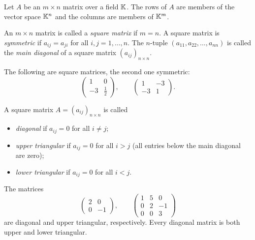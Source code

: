 \begin{fact}
Let $A$ be an $m\times n$ matrix over a field $\mathbb{K}$. The rows of $A$ are members of the vector space $\mathbb{K}^n$ and
the columns are members of $\mathbb{K}^m$.
\end{fact}

\begin{definition}
An $m\times n$ matrix is called a \emph{square matrix} if $m=n$. A square matrix is \emph{symmetric} if
$a_{ij}=a_{ji}$ for all $i,j=1,\ldots,n$. The $n$-tuple $(a_{11},a_{22},\ldots,a_{nn})$ is called the
\emph{main diagonal} of a square matrix $(a_{ij})_{n\times n}$.
\end{definition}

\begin{example}
The following are square matrices, the second one symmetric:
\[
\left( \begin{array}{cc} 1 & 0 \\ -3 & \tfrac{1}{2} \end{array} \right), \qquad
\left( \begin{array}{cc} 1 & -3 \\ -3 & 1 \end{array} \right).
\]
\end{example}

\begin{definition}
A square matrix $A = (a_{ij})_{n\times n}$ is called
\begin{itemize}
\item \emph{diagonal} if $a_{ij} = 0$ for all $i\neq j$;
\item \emph{upper triangular} if $a_{ij} = 0$ for all $i>j$ (all entries below the main diagonal are zero);
\item \emph{lower triangular} if $a_{ij} = 0$ for all $i<j$.
\end{itemize}
\end{definition}

\begin{example}
The matrices
\[
\left( \begin{array}{cc} 2 & 0 \\ 0 & -1 \end{array} \right), \qquad
\left( \begin{array}{ccc} 1 & 5 & 0 \\ 0 & 2 & -1 \\ 0 & 0 & 3 \end{array} \right)
\]
are diagonal and upper triangular, respectively. Every diagonal matrix is both upper and lower triangular.
\end{example}

